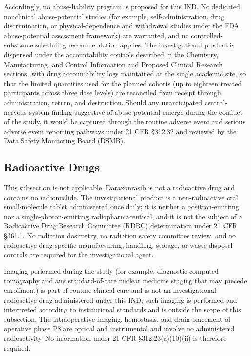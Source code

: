 Accordingly, no abuse-liability program is proposed for this IND. No dedicated
nonclinical abuse-potential studies (for example, self-administration, drug
discrimination, or physical-dependence and withdrawal studies under the FDA
abuse-potential assessment framework) are warranted, and no controlled-substance
scheduling recommendation applies. The investigational product is dispensed under
the accountability controls described in the Chemistry, Manufacturing, and Control
Information and Proposed Clinical Research sections, with drug accountability logs
maintained at the single academic site, so that the limited quantities used for the
planned cohorts (up to eighteen treated participants across three dose levels) are
reconciled from receipt through administration, return, and destruction. Should any
unanticipated central-nervous-system finding suggestive of abuse potential emerge
during the conduct of the study, it would be captured through the routine adverse
event and serious adverse event reporting pathways under 21 CFR \S 312.32 and
reviewed by the Data Safety Monitoring Board (DSMB).

\subsection{Radioactive Drugs}

This subsection is not applicable. Daraxonrasib is not a radioactive drug and
contains no radionuclide. The investigational product is a non-radioactive oral
small-molecule tablet administered once daily; it is neither a positron-emitting
nor a single-photon-emitting radiopharmaceutical, and it is not the subject of a
Radioactive Drug Research Committee (RDRC) determination under 21 CFR \S 361.1. No
radiation dosimetry, no radiation safety committee review, and no radioactive
drug-specific manufacturing, handling, storage, or waste-disposal controls are
required for the investigational agent.

Imaging performed during the study (for example, diagnostic computed tomography and
any standard-of-care nuclear medicine staging that may precede enrollment) is part
of routine clinical care and is not an investigational radioactive drug administered
under this IND; such imaging is performed and interpreted according to institutional
standards and is outside the scope of this subsection. The intraoperative imaging,
hemostasis, and drain placement of operative phase P8 are optical and instrumental
and involve no administered radioactivity. No information under 21 CFR
\S 312.23(a)(10)(ii) is therefore required.

